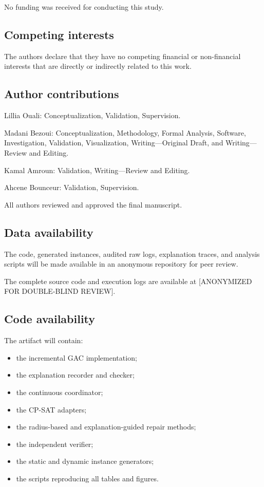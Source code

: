 \documentclass[pdflatex,sn-mathphys-num,iicol,oneside]{sn-jnl}
\begin{document}
No funding was received for conducting this study.

\subsection*{Competing interests}

The authors declare that they have no competing financial or
non-financial interests that are directly or indirectly related to
this work.

\subsection*{Author contributions}

Lillia Ouali: Conceptualization, Validation, Supervision.

Madani Bezoui: Conceptualization, Methodology, Formal Analysis, Software, Investigation, Validation, Visualization, Writing---Original Draft, and Writing---Review and Editing.

Kamal Amroun: Validation, Writing---Review and Editing.

Ahcene Bounceur: Validation, Supervision.

All authors reviewed and approved the final manuscript.

\subsection*{Data availability}

The code, generated instances, audited raw logs, explanation traces,
and analysis scripts will be made available in an anonymous repository
for peer review.

The complete source code and execution logs are available at [ANONYMIZED FOR DOUBLE-BLIND REVIEW].

\subsection*{Code availability}

The artifact will contain:

\begin{itemize}
    \item the incremental GAC implementation;
    \item the explanation recorder and checker;
    \item the continuous coordinator;
    \item the CP-SAT adapters;
    \item the radius-based and explanation-guided repair methods;
    \item the independent verifier;
    \item the static and dynamic instance generators;
    \item the scripts reproducing all tables and figures.
\end{itemize}
\end{document}
